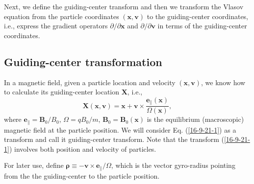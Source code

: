 \documentclass{article}
\newcommand{\tmmathbf}[1]{\ensuremath{\boldsymbol{#1}}}
\begin{document}
Next, we define the guiding-center transform and then we transform the Vlasov
equation from the particle coordinates $(\mathbf{x}, \mathbf{v})$ to the
guiding-center coordinates, i.e., express the gradient operators $\partial /
\partial \mathbf{x}$ and $\partial / \partial \mathbf{v}$ in terms of the
guiding-center coordinates.

\subsection{Guiding-center transformation}

In a magnetic field, given a particle location and velocity $(\mathbf{x},
\mathbf{v})$, we know how to calculate its guiding-center location
$\mathbf{X}$, i.e.,
\begin{equation}
  \label{16-9-21-1} \mathbf{X} (\mathbf{x}, \mathbf{v}) =\mathbf{x}+\mathbf{v}
  \times \frac{\tmmathbf{e}_{\parallel} (\mathbf{x})}{\Omega (\mathbf{x})},
\end{equation}
where $\tmmathbf{e}_{\parallel} =\mathbf{B}_0 / B_0$, $\Omega = q B_0 / m$,
$\mathbf{B}_0 =\mathbf{B}_0 (\mathbf{x})$ is the equilibrium (macroscopic)
magnetic field at the particle position. We will consider Eq.
(\ref{16-9-21-1}) as a transform and call it guiding-center
transform{\cite{Catto1978}}. Note that the transform (\ref{16-9-21-1})
involves both position and velocity of particles.

For later use, define $\tmmathbf{\rho} \equiv -\mathbf{v} \times
\mathbf{e}_{\parallel} / \Omega$, which is the vector gyro-radius pointing
from the the guiding-center to the particle position.
\end{document}
